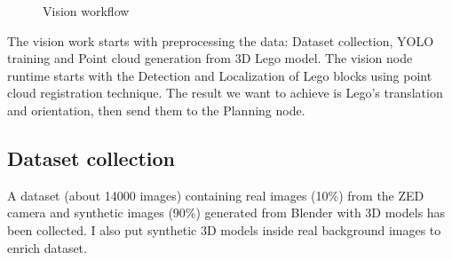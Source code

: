 \documentclass{article}
\begin{document}
	\begin{figure}[H]
		\centering
		\caption{Vision workflow}
		\label{fig:design-vision}
	\end{figure}
	
	The vision work starts with preprocessing the data: Dataset collection, YOLO training and Point cloud generation from 3D Lego model. The vision node runtime starts with the Detection and Localization of Lego blocks using point cloud registration technique. The result we want to achieve is Lego's translation and orientation, then send them to the Planning node.
	
	\subsection{Dataset collection}
	A dataset (about 14000 images) containing real images (10\%) from the ZED camera and synthetic images (90\%) generated from Blender with 3D models has been collected. I also put synthetic 3D models inside real background images to enrich dataset.\\
	
\end{document}
